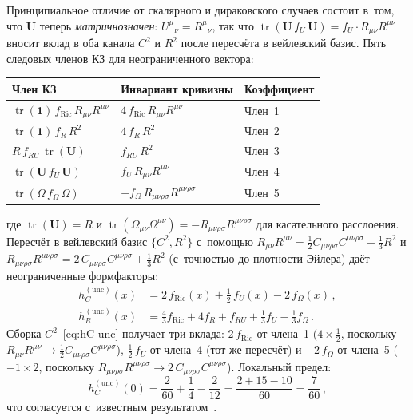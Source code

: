 \documentclass[aps,prd,twocolumn,superscriptaddress,nofootinbib,floatfix]{revtex4-2}
\theoremstyle{definition}
\theoremstyle{remark}
\newcommand{\Weylsq}{C_{\mu\nu\rho\sigma}C^{\mu\nu\rho\sigma}}
\newcommand{\Ricsq}{R_{\mu\nu}R^{\mu\nu}}
\newcommand{\Riemsq}{R_{\mu\nu\rho\sigma}R^{\mu\nu\rho\sigma}}
\newcommand{\tr}{\operatorname{tr}}
\begin{document}
Принципиальное отличие от скалярного и дираковского случаев состоит
в~том, что $\mathbf{U}$ теперь \emph{матричнозначен}:
$U^\mu{}_\nu = R^\mu{}_\nu$, так что
$\tr(\mathbf{U}\,f_U\,\mathbf{U}) = f_U \cdot R_{\mu\nu}R^{\mu\nu}$
вносит вклад в оба канала $C^2$ и $R^2$ после пересчёта в вейлевский
базис. Пять следовых членов КЗ для неограниченного вектора:
\begin{center}
\renewcommand{\arraystretch}{1.15}
\begin{tabular}{@{}lll@{}}
  \toprule
  Член КЗ & Инвариант кривизны & Коэффициент \\
  \midrule
  $\tr(\mathbf{1})\,f_{\text{Ric}}\,\Ricsq$ & $4\,f_{\text{Ric}}\,\Ricsq$ &
    Член~1 \\
  $\tr(\mathbf{1})\,f_R\,R^2$ & $4\,f_R\,R^2$ & Член~2 \\
  $R\,f_{RU}\,\tr(\mathbf{U})$ & $f_{RU}\,R^2$ & Член~3 \\
  $\tr(\mathbf{U}\,f_U\,\mathbf{U})$ & $f_U\,\Ricsq$ & Член~4 \\
  $\tr(\Omega\,f_\Omega\,\Omega)$ & $-f_\Omega\,\Riemsq$ & Член~5 \\
  \bottomrule
\end{tabular}
\end{center}
где $\tr(\mathbf{U}) = R$ и $\tr(\Omega_{\mu\nu}\Omega^{\mu\nu}) =
-\Riemsq$ для касательного расслоения. Пересчёт в вейлевский базис
$\{C^2, R^2\}$ с~помощью $\Ricsq = \tfrac{1}{2}\Weylsq + \tfrac{1}{3}R^2$
и $\Riemsq = 2\,\Weylsq + \tfrac{1}{3}R^2$ (с~точностью до плотности
Эйлера) даёт неограниченные формфакторы:
\begin{subequations}
\label{eq:vector-unc}
\begin{align}
  h_C^{(\text{unc})}(x) &= 2\,f_{\text{Ric}}(x) + \tfrac{1}{2}\,f_U(x)
    - 2\,f_\Omega(x)\,,
  \label{eq:hC-unc}\\
  h_R^{(\text{unc})}(x) &= \tfrac{4}{3}f_{\text{Ric}} + 4f_R
    + f_{RU} + \tfrac{1}{3}f_U - \tfrac{1}{3}f_\Omega\,.
  \label{eq:hR-unc}
\end{align}
\end{subequations}
Сборка $C^2$~\eqref{eq:hC-unc} получает три вклада:
$2\,f_{\text{Ric}}$ от члена~1 ($4 \times \tfrac{1}{2}$, поскольку
$\Ricsq \to \tfrac{1}{2}\Weylsq$), $\tfrac{1}{2}\,f_U$ от члена~4
(тот же пересчёт) и $-2\,f_\Omega$ от члена~5 ($-1 \times 2$, поскольку
$\Riemsq \to 2\,\Weylsq$). Локальный предел:
\begin{equation}
  h_C^{(\text{unc})}(0) = \frac{2}{60} + \frac{1}{4} - \frac{2}{12}
  = \frac{2 + 15 - 10}{60} = \frac{7}{60}\,,
\end{equation}
что согласуется с~известным результатом~\cite{Stelle:1976gc,Codello:2008vh}.
\end{document}
